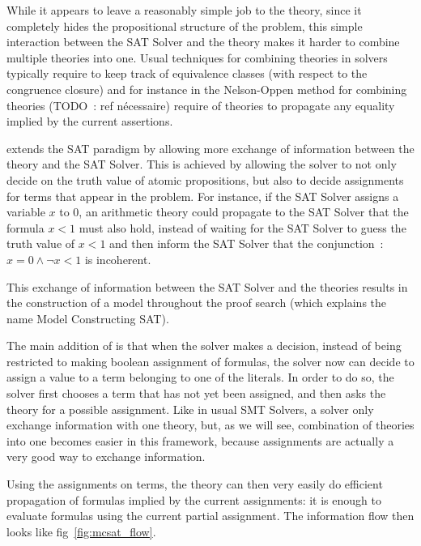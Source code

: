\documentclass{article}
\begin{document}
While it appears to leave a reasonably simple job to the theory, since it completely
hides the propositional structure of the problem, this simple interaction between the
SAT Solver and the theory makes it harder to combine multiple theories into one. Usual
techniques for combining theories in \smt{} solvers typically require to keep track of
equivalence classes (with respect to the congruence closure) and for instance
in the Nelson-Oppen method for combining theories (TODO~: ref nécessaire) require of
theories to propagate any equality implied by the current assertions.

\mcsat{} extends the SAT paradigm by allowing more exchange of information between the theory
and the SAT Solver. This is achieved by allowing the solver to not only decide on the truth value
of atomic propositions, but also to decide assignments for terms that appear in the problem.
For instance, if the SAT Solver assigns a variable $x$ to $0$,
an arithmetic theory could propagate to the SAT Solver that the formula $x < 1$ must also hold,
instead of waiting for the SAT Solver to guess the truth value of $x < 1$ and then
inform the SAT Solver that the conjunction~: $x = 0 \land \neg x < 1$ is incoherent.

This exchange of information between the SAT Solver and the theories results in
the construction of a model throughout the proof search (which explains the name
Model Constructing SAT).

The main addition of \mcsat{} is that when the solver makes a decision, instead of
being restricted to making boolean assignment of formulas, the solver now can
decide to assign a value to a term belonging to one of the literals. In order to do so,
the solver first chooses a term that has not yet been assigned, and then asks
the theory for a possible assignment. Like in usual SMT Solvers, a \mcsat{} solver
only exchange information with one theory, but, as we will see, combination
of theories into one becomes easier in this framework, because assignments are
actually a very good way to exchange information.

Using the assignments on terms, the theory can then very easily do efficient
propagation of formulas implied by the current assignments: it is enough to
evaluate formulas using the current partial assignment.
The information flow then looks like fig~\ref{fig:mcsat_flow}.
\end{document}
